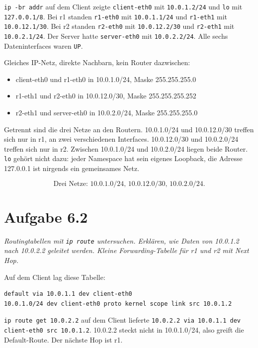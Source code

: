 \documentclass[a4paper,11pt]{article}
\newif\ifexplain
\newcommand{\aufgabe}[1]{\section*{Aufgabe #1}}
\newcommand{\angabe}[1]{{\raggedright\textit{#1}\par}\smallskip}
\newcommand{\explain}[1]{\ifexplain\begin{erklbox}#1\end{erklbox}\fi}
\begin{document}
\texttt{ip -br addr} auf dem Client zeigte \texttt{client-eth0} mit \texttt{10.0.1.2/24} und \texttt{lo} mit \texttt{127.0.0.1/8}. Bei r1 standen \texttt{r1-eth0} mit \texttt{10.0.1.1/24} und \texttt{r1-eth1} mit \texttt{10.0.12.1/30}. Bei r2 standen \texttt{r2-eth0} mit \texttt{10.0.12.2/30} und \texttt{r2-eth1} mit \texttt{10.0.2.1/24}. Der Server hatte \texttt{server-eth0} mit \texttt{10.0.2.2/24}. Alle sechs Dateninterfaces waren \texttt{UP}.

Gleiches IP-Netz, direkte Nachbarn, kein Router dazwischen:
\begin{itemize}[nosep]
\item client-eth0 und r1-eth0 in 10.0.1.0/24, Maske 255.255.255.0
\item r1-eth1 und r2-eth0 in 10.0.12.0/30, Maske 255.255.255.252
\item r2-eth1 und server-eth0 in 10.0.2.0/24, Maske 255.255.255.0
\end{itemize}
Getrennt sind die drei Netze an den Routern. 10.0.1.0/24 und 10.0.12.0/30 treffen sich nur in r1, an zwei verschiedenen Interfaces. 10.0.12.0/30 und 10.0.2.0/24 treffen sich nur in r2. Zwischen 10.0.1.0/24 und 10.0.2.0/24 liegen beide Router. \texttt{lo} gehört nicht dazu: jeder Namespace hat sein eigenes Loopback, die Adresse 127.0.0.1 ist nirgends ein gemeinsames Netz.

\explain{Ein gemeinsames Präfix in der Adresse reicht nicht. 10.0.1.2 und 10.0.2.2 beginnen beide mit 10, liegen aber in verschiedenen /24-Netzen. Es zählt die Maske, die \texttt{ip addr} hinter dem Schrägstrich nennt. /30 auf der Strecke zwischen r1 und r2 hat genau zwei nutzbare Adressen, .1 und .2. .0 ist die Netzadresse, .3 der Broadcast. Deshalb stehen in der Vorlage genau diese beiden Routeradressen.}
\[\boxed{\text{Drei Netze: 10.0.1.0/24, 10.0.12.0/30, 10.0.2.0/24.}}\]

\aufgabe{6.2}
\angabe{Routingtabellen mit \texttt{ip route} untersuchen. Erklären, wie Daten von 10.0.1.2 nach 10.0.2.2 geleitet werden. Kleine Forwarding-Tabelle für r1 und r2 mit Next Hop.}
Auf dem Client lag diese Tabelle:
\begin{lstlisting}
default via 10.0.1.1 dev client-eth0
10.0.1.0/24 dev client-eth0 proto kernel scope link src 10.0.1.2
\end{lstlisting}
\texttt{ip route get 10.0.2.2} auf dem Client lieferte \texttt{10.0.2.2 via 10.0.1.1 dev client-eth0 src 10.0.1.2}. 10.0.2.2 steckt nicht in 10.0.1.0/24, also greift die Default-Route. Der nächste Hop ist r1.
\end{document}

